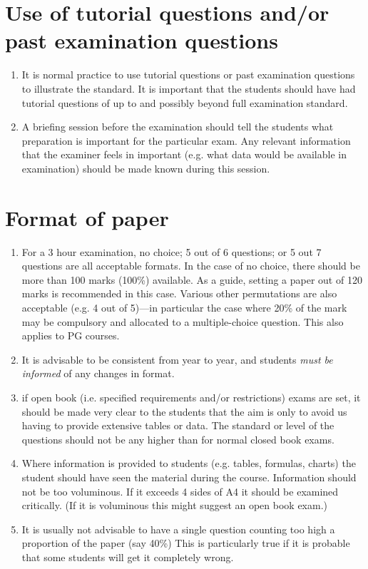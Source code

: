 \documentclass{ArcHandout}
\begin{document}
\section{Use of tutorial questions and/or past examination questions}
\begin{enumerate}

  \item It is normal practice to use tutorial questions or past examination
  questions to illustrate the standard. It is important that the students
  should have had tutorial questions of up to and possibly beyond full
  examination standard. 
  
  \item A briefing session before the examination should tell the students
  what preparation is important for the particular exam.  Any relevant
  information that the examiner feels in important (e.g. what data would be
  available in examination) should be made known during this session.

\end{enumerate}

\section{Format of paper}
\label{sec:format}
\begin{enumerate}
  \item For a 3 hour examination, no choice; 5 out of 6 questions; or 5 out
  7 questions are all acceptable formats. In the case of no choice, there
  should be more than 100 marks (100\%) available. As a guide, setting a
  paper out of 120 marks is recommended in this case.  Various other
  permutations are also acceptable (e.g. 4 out of 5)---in particular the
  case where 20\% of the mark may be compulsory and allocated to a
  multiple-choice question.  This also applies to PG courses. 

  \item It is advisable to be consistent from year to year, and students
  \emph{must be informed} of any changes in format.

  \item if open book (i.e. specified requirements and/or
  restrictions) exams are set, it should be made very clear to the
  students that the aim is only to avoid us having to provide extensive
  tables or data.  The standard or level of the questions should not be any
  higher than for normal closed book exams.

  \item Where information is provided to students (e.g. tables, formulas,
  charts) the student should have seen the material during the course.
  Information should not be too voluminous. If it exceeds 4 sides of A4 it
  should be examined critically. (If it is voluminous this might suggest an
  open book exam.)

  \item It is usually not advisable to have a single question counting too
  high a proportion of the paper (say 40\%) This is particularly true if it
  is probable that some students will get it completely wrong. 
  \end{enumerate}
\end{document}
